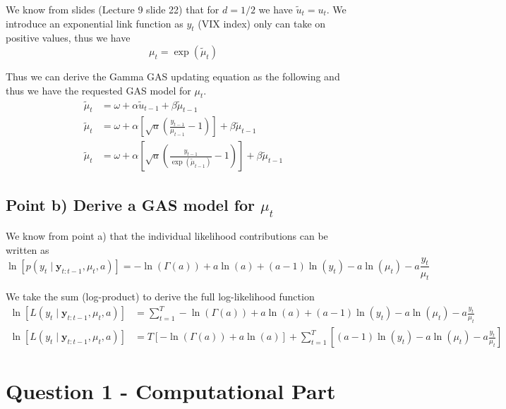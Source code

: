 \documentclass{article}
\begin{document}
We know from slides (Lecture 9 slide 22) that for $d=1/2$ we have
$\widetilde{u}_{t}=u_{t}$. We introduce an exponential link function
as $y_{t}$ (VIX index) only can take on positive values, thus we
have
\[
\mu_{t}=\exp\left(\widetilde{\mu}_{t}\right)
\]

Thus we can derive the Gamma GAS updating equation as the following
and thus we have the requested GAS model for $\mu_{t}$.
\begin{align*}
\widetilde{\mu}_{t} & =\omega+\alpha\widetilde{u}_{t-1}+\beta\widetilde{\mu}_{t-1}\\
\widetilde{\mu}_{t} & =\omega+\alpha\left[\sqrt{a}\left(\frac{y_{t-1}}{\mu_{t-1}}-1\right)\right]+\beta\widetilde{\mu}_{t-1}\\
\widetilde{\mu}_{t} & =\omega+\alpha\left[\sqrt{a}\left(\frac{y_{t-1}}{\exp\left(\widetilde{\mu}_{t-1}\right)}-1\right)\right]+\beta\widetilde{\mu}_{t-1}
\end{align*}


\subsection{Point b) Derive a GAS model for $\mu_{t}$}

We know from point a) that the individual likelihood contributions
can be written as
\[
\ln\left[p\left(y_{t}\mid\mathbf{y}_{t:t-1},\mu_{t},a\right)\right]=-\ln\left(\Gamma\left(a\right)\right)+a\ln\left(a\right)+\left(a-1\right)\ln\left(y_{t}\right)-a\ln\left(\mu_{t}\right)-a\frac{y_{t}}{\mu_{t}}
\]

We take the sum (log-product) to derive the full log-likelihood function
\begin{align*}
\ln\left[L\left(y_{t}\mid\mathbf{y}_{t:t-1},\mu_{t},a\right)\right] & =\sum_{t=1}^{T}-\ln\left(\Gamma\left(a\right)\right)+a\ln\left(a\right)+\left(a-1\right)\ln\left(y_{t}\right)-a\ln\left(\mu_{t}\right)-a\frac{y_{t}}{\mu_{t}}\\
\ln\left[L\left(y_{t}\mid\mathbf{y}_{t:t-1},\mu_{t},a\right)\right] & =T\left[-\ln\left(\Gamma\left(a\right)\right)+a\ln\left(a\right)\right]+\sum_{t=1}^{T}\left[\left(a-1\right)\ln\left(y_{t}\right)-a\ln\left(\mu_{t}\right)-a\frac{y_{t}}{\mu_{t}}\right]
\end{align*}


\section{Question 1 - Computational Part}
\end{document}
